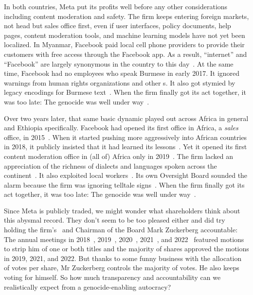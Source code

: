 In both countries, Meta put its profits well before any other considerations
including content moderation and safety. The firm keeps entering foreign
markets, not head but sales office first, even if user interfaces, policy
documents, help pages, content moderation tools, and machine learning models
have not yet been localized. In Myanmar, Facebook paid local cell phone
providers to provide their customers with free access through the Facebook app.
As a result, ``internet'' and ``Facebook'' are largely synonymous in the country
to this day~\cite{Strom2016}. At the same time, Facebook had no employees who
speak Burmese in early 2017. It ignored warnings from human rights organizations
and other \NGO{}s. It also got stymied by legacy encodings for Burmese
text~\cite{LaGrowPruzan2019,Wade2022}. When the firm finally got its act
together, it was too late: The genocide was well under
way~\cite{McLaughlin2018,MilkoOrtutay2022,Mozur2018,Ortutay2022}.

Over two years later, that same basic dynamic played out across Africa in
general and Ethiopia specifically. Facebook had opened its first office in
Africa, a \emph{sales} office, in 2015~\cite{Wagner2015}. When it started
pushing more aggressively into African countries in 2018, it publicly insisted
that it had learned its lessons~\cite{Tiku2018}. Yet it opened its first content
moderation office in (all of) Africa only in 2019~\cite{Agutu2019}. The firm
lacked an appreciation of the richness of dialects and languages spoken across
the continent~\cite{FickDave2019,JacksonTownsendea2022,Madung2021}. It also
exploited local workers~\cite{AlSibai2022,Perrigo2022,Perrigo2023}. Its own
Oversight Board sounded the alarm because the firm was ignoring telltale
signs~\cite{Faife2021}. When the firm finally got its act together, it was too
late: The genocide was well under
way~\cite{Allen2022,Gilbert2020,GlobalWitness2022,Ilori2020,Malik2022,ElliottChristopherea2021,ZelalemGuest2021,RobinsEarly2021}.

Since Meta is publicly traded, we might wonder what shareholders think about
this abysmal record. They don't seem to be too pleased either and did try
holding the firm's \CEO\ and Chairman of the Board Mark Zuckerberg accountable:
The annual meetings in 2018~\cite{Butler2018}, 2019~\cite{Sumagaysay2019},
2020~\cite{McRitchie2020}, 2021~\cite{Nix2021}, and 2022~\cite{WatersAgnew2022}
featured motions to strip him of one or both titles and the majority of shares
approved the motions in 2019, 2021, and 2022. But thanks to some funny business
with the allocation of votes per share, Mr Zuckerberg controls the majority of
votes. He also keeps voting for himself. So how much transparency and
accountability can we realistically expect from a genocide-enabling autocracy?
